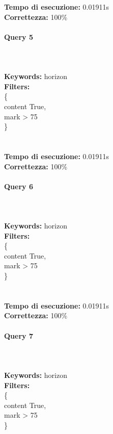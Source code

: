 \documentclass[12pt]{book}
\begin{document}
\noindent
\textbf{Tempo di esecuzione:} 0.01911s \\
\textbf{Correttezza:} 100\%

\paragraph{Query 5} ~ \\ \\

\noindent \textbf{Keywords: } horizon \\
\textbf{Filters: } \\
\indent \{ \\
\indent \indent content True, \\
\indent \indent mark > 75 \\
\indent \} \\\\\\


\noindent
\textbf{Tempo di esecuzione:} 0.01911s \\
\textbf{Correttezza:} 100\%

\paragraph{Query 6} ~ \\ \\

\noindent \textbf{Keywords: } horizon \\
\textbf{Filters: } \\
\indent \{ \\
\indent \indent content True, \\
\indent \indent mark > 75 \\
\indent \} \\\\\\


\noindent
\textbf{Tempo di esecuzione:} 0.01911s \\
\textbf{Correttezza:} 100\%

\paragraph{Query 7} ~ \\ \\

\noindent \textbf{Keywords: } horizon \\
\textbf{Filters: } \\
\indent \{ \\
\indent \indent content True, \\
\indent \indent mark > 75 \\
\indent \} \\\\\\
\end{document}
